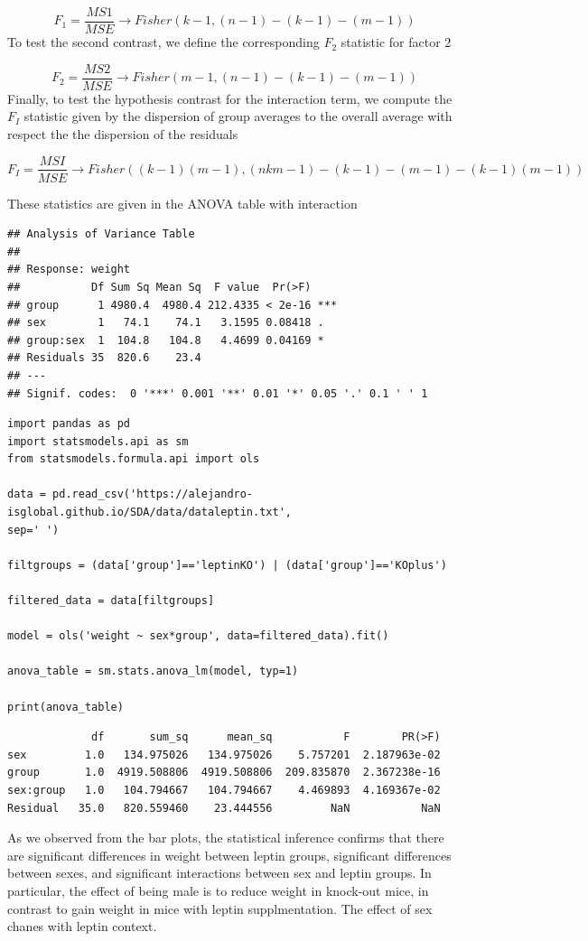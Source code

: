 \documentclass[
]{book}
\begin{document}
\[F_1=\frac{MS1}{MSE} \rightarrow Fisher(k-1,(n-1)-(k-1)-(m-1))\]
To test the second contrast, we define the corresponding \(F_2\) statistic for factor 2

\[F_2=\frac{MS2}{MSE} \rightarrow Fisher(m-1,(n-1)-(k-1)-(m-1))\]
Finally, to test the hypothesis contrast for the interaction term, we compute the \(F_I\) statistic given by the dispersion of group averages to the overall average with respect the the dispersion of the residuals

\[F_I=\frac{MSI}{MSE}\rightarrow Fisher((k-1)(m-1),(nkm-1) -(k-1)-(m-1)-(k-1)(m-1))\]

These statistics are given in the ANOVA table with interaction

\begin{verbatim}
## Analysis of Variance Table
## 
## Response: weight
##           Df Sum Sq Mean Sq  F value  Pr(>F)    
## group      1 4980.4  4980.4 212.4335 < 2e-16 ***
## sex        1   74.1    74.1   3.1595 0.08418 .  
## group:sex  1  104.8   104.8   4.4699 0.04169 *  
## Residuals 35  820.6    23.4                     
## ---
## Signif. codes:  0 '***' 0.001 '**' 0.01 '*' 0.05 '.' 0.1 ' ' 1
\end{verbatim}

\begin{verbatim}
import pandas as pd
import statsmodels.api as sm
from statsmodels.formula.api import ols

data = pd.read_csv('https://alejandro-isglobal.github.io/SDA/data/dataleptin.txt', 
sep=' ')

filtgroups = (data['group']=='leptinKO') | (data['group']=='KOplus')

filtered_data = data[filtgroups]

model = ols('weight ~ sex*group', data=filtered_data).fit()

anova_table = sm.stats.anova_lm(model, typ=1)

print(anova_table)
\end{verbatim}

\begin{verbatim}
             df       sum_sq      mean_sq           F        PR(>F)
sex         1.0   134.975026   134.975026    5.757201  2.187963e-02
group       1.0  4919.508806  4919.508806  209.835870  2.367238e-16
sex:group   1.0   104.794667   104.794667    4.469893  4.169367e-02
Residual   35.0   820.559460    23.444556         NaN           NaN
\end{verbatim}

As we observed from the bar plots, the statistical inference confirms that there are significant differences in weight between leptin groups, significant differences between sexes, and significant interactions between sex and leptin groups. In particular, the effect of being male is to reduce weight in knock-out mice, in contrast to gain weight in mice with leptin supplmentation. The effect of sex chanes with leptin context.
\end{document}
